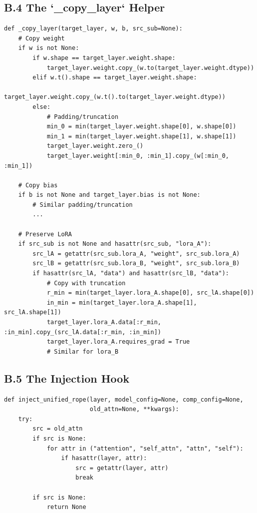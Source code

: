 {\subsection{B.4 The `\_copy\_layer` Helper}

\begin{lstlisting}
def _copy_layer(target_layer, w, b, src_sub=None):
    # Copy weight
    if w is not None:
        if w.shape == target_layer.weight.shape:
            target_layer.weight.copy_(w.to(target_layer.weight.dtype))
        elif w.t().shape == target_layer.weight.shape:
            target_layer.weight.copy_(w.t().to(target_layer.weight.dtype))
        else:
            # Padding/truncation
            min_0 = min(target_layer.weight.shape[0], w.shape[0])
            min_1 = min(target_layer.weight.shape[1], w.shape[1])
            target_layer.weight.zero_()
            target_layer.weight[:min_0, :min_1].copy_(w[:min_0, :min_1])
    
    # Copy bias
    if b is not None and target_layer.bias is not None:
        # Similar padding/truncation
        ...
    
    # Preserve LoRA
    if src_sub is not None and hasattr(src_sub, "lora_A"):
        src_lA = getattr(src_sub.lora_A, "weight", src_sub.lora_A)
        src_lB = getattr(src_sub.lora_B, "weight", src_sub.lora_B)
        if hasattr(src_lA, "data") and hasattr(src_lB, "data"):
            # Copy with truncation
            r_min = min(target_layer.lora_A.shape[0], src_lA.shape[0])
            in_min = min(target_layer.lora_A.shape[1], src_lA.shape[1])
            target_layer.lora_A.data[:r_min, :in_min].copy_(src_lA.data[:r_min, :in_min])
            target_layer.lora_A.requires_grad = True
            # Similar for lora_B
\end{lstlisting}

\subsection{B.5 The Injection Hook}

\begin{lstlisting}
def inject_unified_rope(layer, model_config=None, comp_config=None,
                        old_attn=None, **kwargs):
    try:
        src = old_attn
        if src is None:
            for attr in ("attention", "self_attn", "attn", "self"):
                if hasattr(layer, attr):
                    src = getattr(layer, attr)
                    break
        
        if src is None:
            return None
        

\end{lstlisting}}
